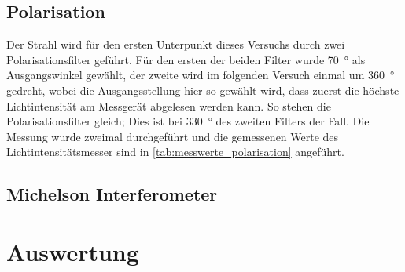 \documentclass[ngerman]{scrartcl}
\begin{document}
\subsection{Polarisation}
\label{sec:durchfuehrung_polarisation}
Der Strahl wird für den ersten Unterpunkt dieses Versuchs durch zwei Polarisationsfilter geführt. Für den ersten der beiden Filter wurde \SI{70}{\degree} als Ausgangswinkel gewählt, der zweite wird im folgenden Versuch einmal um \SI{360}{\degree} gedreht, wobei die Ausgangsstellung hier so gewählt wird, dass zuerst die höchste Lichtintensität am Messgerät abgelesen werden kann. So stehen die Polarisationsfilter gleich; Dies ist bei \SI{330}{\degree} des zweiten Filters der Fall. 
Die Messung wurde zweimal durchgeführt und die gemessenen Werte des Lichtintensitätsmesser sind in \autoref{tab:messwerte_polarisation} angeführt.


\subsection{Michelson Interferometer}
\label{sec:durchfuehrung_michelson}



\section{Auswertung}
\label{sec:auswertung}
\end{document}
